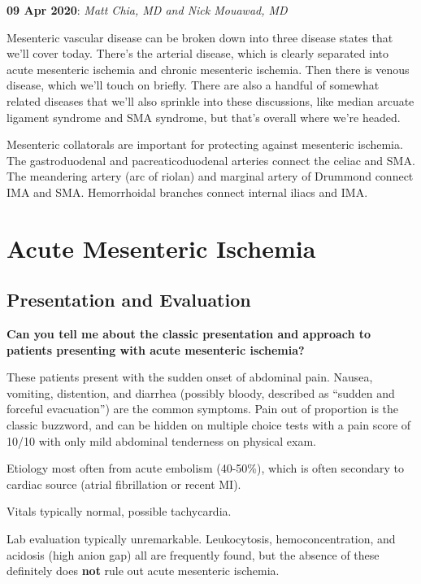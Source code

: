 \documentclass[
]{book}
\begin{document}
\textbf{09 Apr 2020}: \emph{Matt Chia, MD and Nick Mouawad, MD}

Mesenteric vascular disease can be broken down into three disease states
that we'll cover today. There's the arterial disease, which is clearly
separated into acute mesenteric ischemia and chronic mesenteric
ischemia. Then there is venous disease, which we'll touch on briefly.
There are also a handful of somewhat related diseases that we'll also
sprinkle into these discussions, like median arcuate ligament syndrome
and SMA syndrome, but that's overall where we're headed.

Mesenteric collatorals are important for protecting against mesenteric
ischemia. The gastroduodenal and pacreaticoduodenal arteries connect the
celiac and SMA. The meandering artery (arc of riolan) and marginal
artery of Drummond connect IMA and SMA. Hemorrhoidal branches connect
internal iliacs and IMA. \citep{chandraChronicMesentericIschemia2010, vangulikAnastomosisRiolanRevisited2005}

\hypertarget{acute-mesenteric-ischemia}{%
\section{Acute Mesenteric Ischemia}\label{acute-mesenteric-ischemia}}

\hypertarget{presentation-and-evaluation}{%
\subsection{Presentation and Evaluation}\label{presentation-and-evaluation}}

\textbf{Can you tell me about the classic presentation and approach to
patients presenting with acute mesenteric ischemia?}

These patients present with the sudden onset of abdominal pain. Nausea,
vomiting, distention, and diarrhea (possibly bloody, described as
``sudden and forceful evacuation'') are the common symptoms. Pain out of
proportion is the classic buzzword, and can be hidden on multiple choice
tests with a pain score of 10/10 with only mild abdominal tenderness on
physical exam.

Etiology most often from acute embolism (40-50\%), which is often
secondary to cardiac source (atrial fibrillation or recent
MI).\citep{wyersmarkcandmartin133AcuteMesenteric2019}

Vitals typically normal, possible tachycardia.

Lab evaluation typically unremarkable. Leukocytosis, hemoconcentration,
and acidosis (high anion gap) all are frequently found, but the absence
of these definitely does \textbf{not} rule out acute mesenteric ischemia.
\end{document}

